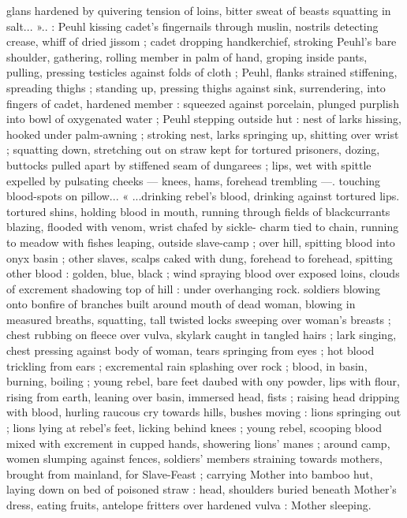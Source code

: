 glans hardened by quivering tension of loins, bitter sweat of beasts
squatting in salt... ».. : Peuhl kissing cadet's fingernails through
muslin, nostrils detecting crease, whiff of dried jissom ; cadet
dropping handkerchief, stroking Peuhl’s bare shoulder, gathering,
rolling member in palm of hand, groping inside pants, pulling,
pressing testicles against folds of cloth ; Peuhl, flanks strained
stiffening, spreading thighs ; standing up, pressing thighs against
sink, surrendering, into fingers of cadet, hardened member :
squeezed against porcelain, plunged purplish into bowl of
oxygenated water ; Peuhl stepping outside hut : nest of larks hissing,
hooked under palm-awning ; stroking nest, larks springing up,
shitting over wrist ; squatting down, stretching out on straw kept for
tortured prisoners, dozing, buttocks pulled apart by stiffened seam
of dungarees ; lips, wet with spittle expelled by pulsating cheeks ---
knees, hams, forehead trembling ---. touching blood-spots on
pillow... « ...drinking rebel's blood, drinking against tortured lips.
tortured shins, holding blood in mouth, running through fields of
blackcurrants blazing, flooded with venom, wrist chafed by sickle-
charm tied to chain, running to meadow with fishes leaping, outside
slave-camp ; over hill, spitting blood into onyx basin ; other slaves,
scalps caked with dung, forehead to forehead, spitting other blood :
golden, blue, black ; wind spraying blood over exposed loins, clouds
of excrement shadowing top of hill : under overhanging rock.
soldiers blowing onto bonfire of branches built around mouth of
dead woman, blowing in measured breaths, squatting, tall twisted
locks sweeping over woman's breasts ; chest rubbing on fleece over
vulva, skylark caught in tangled hairs ; lark singing, chest pressing
against body of woman, tears springing from eyes ; hot blood
trickling from ears ; excremental rain splashing over rock ; blood, in
basin, burning, boiling ; young rebel, bare feet daubed with ony %
powder, lips with flour, rising from earth, leaning over basin,
immersed head, fists ; raising head dripping with blood, hurling
raucous cry towards hills, bushes moving : lions springing out ; lions
lying at rebel's feet, licking behind knees ; young rebel, scooping
blood mixed with excrement in cupped hands, showering lions’
manes ; around camp, women slumping against fences, soldiers’
members straining towards mothers, brought from mainland, for
Slave-Feast ; carrying Mother into bamboo hut, laying down on bed
of poisoned straw : head, shoulders buried beneath Mother's dress,
eating fruits, antelope fritters over hardened vulva : Mother sleeping.
